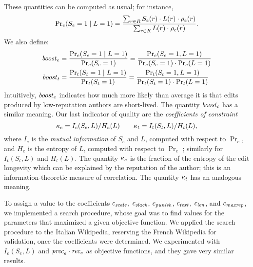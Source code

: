 \fi
These quantities can be computed as usual; for instance, 
\[
  {\textstyle \Pr_e} (S_e=1 \mid L=1) = 
  \frac{\sum_{r \in R} S_e(r) \cdot L(r) \cdot \editmass(r)}{%
    \sum_{r \in R} L(r) \cdot \editmass(r)}.
\]
We also define: 
%
\begin{align*}
  {\text{\textit{boost}}}_e & = \frac{\Pr_e(S_e=1 \mid L=1)}{\Pr_e(S_e=1)}
            = \frac{\Pr_e(S_e=1 , L=1)}{\Pr_e(S_e=1)\cdot\Pr_e(L=1)} \\
  {\text{\textit{boost}}}_t & = \frac{\Pr_t(S_t=1 \mid L=1)}{\Pr_t(S_t=1)}
            = \frac{\Pr_t(S_t=1 , L=1)}{\Pr_t(S_t=1)\cdot\Pr_t(L=1)}
\end{align*}
%
Intuitively, ${\text{\textit{boost}}}_e$ indicates how much more likely than average
it is that edits produced by low-reputation authors are short-lived.
The quantity ${\text{\textit{boost}}}_t$ has a similar meaning. 
Our last indicator of quality are the {\em coefficients of constraint\/}
\[ 
  \kappa_e = I_e(S_e,L) / H_e(L)
  \qquad 
  \kappa_t = I_t(S_t,L) / H_t(L),
\]
where $I_e$ is the {\em mutual information\/} of $S_e$ and $L$,
computed with respect to $\Pr_e$, and $H_e$ is the entropy of $L$,
computed with respect to $\Pr_e$ \cite{CoverBook}; similarly for
$I_t(S_t,L)$ and $H_t(L)$.
The quantity $\kappa_e$ is the fraction of the entropy of the
edit longevity which can be explained by the reputation of the author; 
this is an information-theoretic measure of correlation. 
The quantity $\kappa_t$ has an analogous meaning. 

To assign a value to the coefficients ${c_{{\text{\textit{scale}}}}}$, ${c_{{\text{\textit{slack}}}}}$,
${c_{{\text{\textit{punish}}}}}$, ${c_{{\text{\textit{text}}}}}$, ${c_{{\text{\textit{len}}}}}$, and ${c_{{\text{\textit{maxrep}}}}}$, 
we implemented a search procedure, whose goal was to find values for
the parameters that maximized a given objective function. 
We applied the search procedure to the Italian Wikipedia, reserving
the French Wikipedia for validation, once the coefficients were
determined. 
We experimented with $I_e(S_e,L)$ and ${\text{\textit{prec}}}_e \cdot {\text{\textit{rec}}}_e$
as objective functions, and they gave very similar results. 
